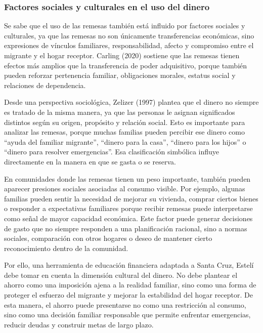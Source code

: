 \documentclass[12pt,letterpaper]{article}
\begin{document}
\subsubsection{\texorpdfstring{\textbf{Factores sociales y culturales en el uso del dinero}}{Factores sociales y culturales en el uso del dinero}}\label{factores-sociales-y-culturales-en-el-uso-del-dinero}

Se sabe que el uso de las remesas también está influido por factores sociales y culturales, ya que las remesas no son únicamente transferencias económicas, sino expresiones de vínculos familiares, responsabilidad, afecto y compromiso entre el migrante y el hogar receptor. Carling (2020) sostiene que las remesas tienen efectos más amplios que la transferencia de poder adquisitivo, porque también pueden reforzar pertenencia familiar, obligaciones morales, estatus social y relaciones de dependencia.

Desde una perspectiva sociológica, Zelizer (1997) plantea que el dinero no siempre es tratado de la misma manera, ya que las personas le asignan significados distintos según su origen, propósito y relación social. Esto es importante para analizar las remesas, porque muchas familias pueden percibir ese dinero como ``ayuda del familiar migrante'', ``dinero para la casa'', ``dinero para los hijos'' o ``dinero para resolver emergencias''. Esa clasificación simbólica influye directamente en la manera en que se gasta o se reserva.

En comunidades donde las remesas tienen un peso importante, también pueden aparecer presiones sociales asociadas al consumo visible. Por ejemplo, algunas familias pueden sentir la necesidad de mejorar su vivienda, comprar ciertos bienes o responder a expectativas familiares porque recibir remesas puede interpretarse como señal de mayor capacidad económica. Este factor puede generar decisiones de gasto que no siempre responden a una planificación racional, sino a normas sociales, comparación con otros hogares o deseo de mantener cierto reconocimiento dentro de la comunidad.

Por ello, una herramienta de educación financiera adaptada a Santa Cruz, Estelí debe tomar en cuenta la dimensión cultural del dinero. No debe plantear el ahorro como una imposición ajena a la realidad familiar, sino como una forma de proteger el esfuerzo del migrante y mejorar la estabilidad del hogar receptor. De esta manera, el ahorro puede presentarse no como una restricción al consumo, sino como una decisión familiar responsable que permite enfrentar emergencias, reducir deudas y construir metas de largo plazo.
\end{document}

